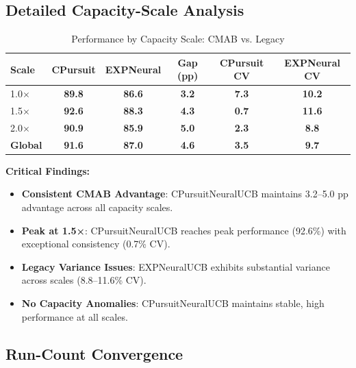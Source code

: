 \documentclass[12pt,a4paper]{article}
\newcommand{\success}[1]{\textcolor{accentgreen}{\textbf{#1}}}
\newcommand{\legacy}[1]{\textcolor{legacycolor}{\textbf{#1}}}
\begin{document}
\subsection{Detailed Capacity-Scale Analysis}

\begin{table}[H]
\centering
\caption{Performance by Capacity Scale: CMAB vs. Legacy}
\begin{tabular}{@{}lccccc@{}}
\toprule
\textbf{Scale} & \textbf{CPursuit} & \textbf{EXPNeural} & \textbf{Gap (pp)} & \textbf{CPursuit CV} & \textbf{EXPNeural CV} \\
\midrule
1.0$\times$ & \success{89.8} & \legacy{86.6} & \success{3.2} & \success{7.3} & \legacy{10.2} \\
1.5$\times$ & \success{92.6} & \legacy{88.3} & \success{4.3} & \success{0.7} & \legacy{11.6} \\
2.0$\times$ & \success{90.9} & \legacy{85.9} & \success{5.0} & \success{2.3} & \legacy{8.8} \\
\midrule
\textbf{Global} & \textbf{\success{91.6}} & \textbf{\legacy{87.0}} & \textbf{\success{4.6}} & \textbf{\success{3.5}} & \textbf{\legacy{9.7}} \\
\bottomrule
\end{tabular}
\end{table}

\textbf{Critical Findings:}

\begin{itemize}
    \item \success{Consistent CMAB Advantage}: CPursuitNeuralUCB maintains 3.2--5.0 pp advantage across all capacity scales.
    
    \item \success{Peak at 1.5×}: CPursuitNeuralUCB reaches peak performance (92.6\%) with exceptional consistency (0.7\% CV).
    
    \item \legacy{Legacy Variance Issues}: EXPNeuralUCB exhibits substantial variance across scales (8.8--11.6\% CV).
    
    \item \success{No Capacity Anomalies}: CPursuitNeuralUCB maintains stable, high performance at all scales.
\end{itemize}

\subsection{Run-Count Convergence}
\end{document}
